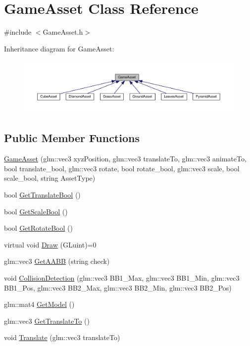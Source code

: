 \hypertarget{class_game_asset}{}\section{Game\+Asset Class Reference}
\label{class_game_asset}


{\ttfamily \#include $<$Game\+Asset.\+h$>$}



Inheritance diagram for Game\+Asset\+:\nopagebreak
\begin{figure}[H]
\begin{center}
\leavevmode
\includegraphics[width=350pt]{class_game_asset__inherit__graph}
\end{center}
\end{figure}
\subsection*{Public Member Functions}
\begin{DoxyCompactItemize}
\item 
\hyperlink{class_game_asset_a9de932075d9b4263e7fb24fbfd163a61}{Game\+Asset} (glm\+::vec3 xyz\+Position, glm\+::vec3 translate\+To, glm\+::vec3 animate\+To, bool translate\+\_\+bool, glm\+::vec3 rotate, bool rotate\+\_\+bool, glm\+::vec3 scale, bool scale\+\_\+bool, string Asset\+Type)
\item 
bool \hyperlink{class_game_asset_af74bc1c4f6b87a4843217637b75290d4}{Get\+Translate\+Bool} ()
\item 
bool \hyperlink{class_game_asset_ae0a76a50ff3c6c119852c195053c9a38}{Get\+Scale\+Bool} ()
\item 
bool \hyperlink{class_game_asset_a9fb9187dfca6160898344e79d41de224}{Get\+Rotate\+Bool} ()
\item 
virtual void \hyperlink{class_game_asset_a961aa51ca0a9961fc584c0b5d5431300}{Draw} (G\+Luint)=0
\item 
glm\+::vec3 \hyperlink{class_game_asset_a992a9c94083ee91bda85a4ec367c4fb3}{Get\+A\+A\+B\+B} (string check)
\item 
void \hyperlink{class_game_asset_abd0491ffc6a601f8f3c47a2010f14039}{Collision\+Detection} (glm\+::vec3 B\+B1\+\_\+\+Max, glm\+::vec3 B\+B1\+\_\+\+Min, glm\+::vec3 B\+B1\+\_\+\+Pos, glm\+::vec3 B\+B2\+\_\+\+Max, glm\+::vec3 B\+B2\+\_\+\+Min, glm\+::vec3 B\+B2\+\_\+\+Pos)
\item 
glm\+::mat4 \hyperlink{class_game_asset_a50a4795382fb55c7513314f82821e444}{Get\+Model} ()
\item 
glm\+::vec3 \hyperlink{class_game_asset_af19b5c6341758ee89c8dfb020eb678f6}{Get\+Translate\+To} ()
\item 
void \hyperlink{class_game_asset_a5c0479920e4aa2fea7830a47c1a4e3f3}{Translate} (glm\+::vec3 translate\+To)
\end{DoxyCompactItemize}


